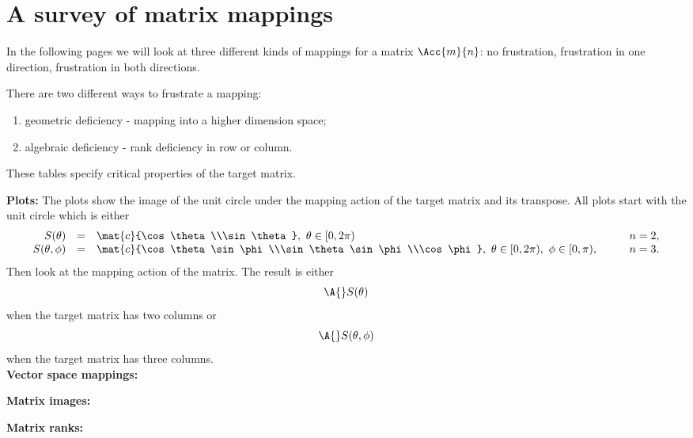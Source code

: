 \section{A survey of matrix mappings}
In the following pages we will look at three different kinds of mappings for a matrix $\Acc{m}{n}$: no frustration, frustration in one direction, frustration in both directions.

There are two different ways to frustrate a mapping:
\begin{enumerate}
\item geometric deficiency - mapping into a higher dimension space;
\item algebraic deficiency - rank deficiency in row or column.
\end{enumerate}

These tables specify critical properties of the target matrix.

\textbf{Plots: }The plots show the image of the unit circle under the mapping action of the target matrix and its transpose. All plots start with the unit circle which is either
\begin{equation}
  \begin{array}{rcll}
     S(\theta) &=& \mat{c}{\cos \theta\\\sin \theta},\ \theta\in[0,2\pi) \qquad &n=2,\\
     S(\theta,\phi) &=& \mat{c}{\cos \theta\sin \phi\\\sin \theta \sin \phi\\\cos \phi},\ \theta\in[0,2\pi),\ \phi\in[0,\pi), \qquad &n=3.
  \end{array}
\end{equation}
Then look at the mapping action of the matrix. The result is either
\begin{equation}
  \A{}S(\theta) 
\end{equation}
when the target matrix has two columns or
\begin{equation}
  \A{}S(\theta,\phi) 
\end{equation}
when the target matrix has three columns.\\
\textbf{Vector space mappings:}

\textbf{Matrix images:}

\textbf{Matrix ranks:}


\clearpage

